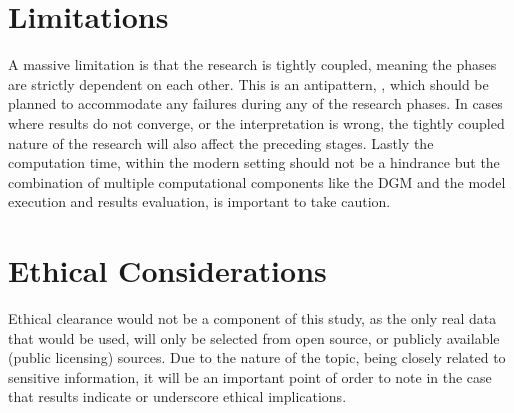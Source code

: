 \section{Limitations} \label{methlim}
A massive limitation is that the research is tightly coupled, meaning the phases are strictly dependent on each other. This is an antipattern, \parencite{joshi_beginning_2016}, which should be planned to accommodate any failures during any of the research phases. In cases where results do not converge, or the interpretation is wrong, the tightly coupled nature of the research will also affect the preceding stages. Lastly the computation time, within the modern setting should not be a hindrance but the combination of multiple computational components like the DGM and the model execution and results evaluation, is important to take caution. 

\section{Ethical Considerations}
Ethical clearance would not be a component of this study, as the only real data that would be used, will only be selected from open source, or publicly available (public licensing) sources. Due to the nature of the topic, being closely related to sensitive information, it will be an important point of order to note in the case that results indicate or underscore ethical implications.

